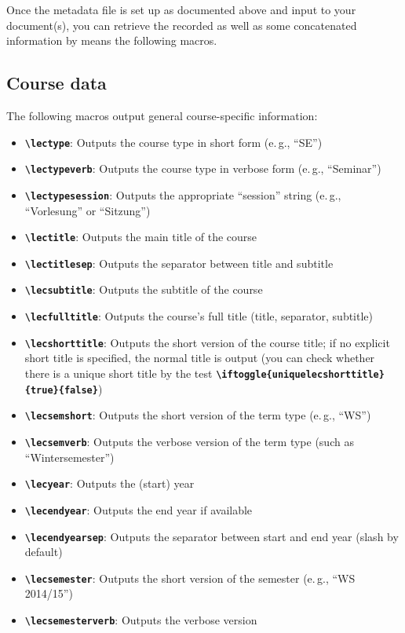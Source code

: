 \documentclass[english]{article}
\newcommand*\jmacro[1]{\textbf{\texttt{#1}}}
\newcommand*\jcsmacro[1]{\jmacro{\textbackslash{#1}}}
\newcommand*\jparam[1]{\angus #1\angud}
\begin{document}
Once the metadata file is set up as documented above and input to
your document(s), you can retrieve the recorded as well as some concatenated
information by means the following macros.


\subsection{Course data}\label{sec:csdata}

The following macros output general course-specific information:
\begin{itemize}
\item \jcsmacro{lectype}: Outputs the course type in short
form (e.\,g., ``SE'')
\item \jcsmacro{lectypeverb}: Outputs the course type in
verbose form (e.\,g., ``Seminar'')
\item \jcsmacro{lectypesession}: Outputs the appropriate
``session'' string (e.\,g., ``Vorlesung'' or ``Sitzung'')
\item \jcsmacro{lectitle}: Outputs the main title of the
course
\item \jcsmacro{lectitlesep}: Outputs the separator between
title and subtitle
\item \jcsmacro{lecsubtitle}: Outputs the subtitle of the course
\item \jcsmacro{lecfulltitle}: Outputs the course's full title
    (title, separator, subtitle)
\item \jcsmacro{lecshorttitle}: Outputs the short version
of the course title; if no explicit short title is specified,
the normal title is output (you can check whether
there is a unique short title by the test
\jcsmacro{iftoggle\{uniquelecshorttitle\}\{\jparam{true}\}\{\jparam{false}\}})
\item \jcsmacro{lecsemshort}: Outputs the short version of
the term type (e.\,g., ``WS'')
\item \jcsmacro{lecsemverb}: Outputs the verbose version
of the term type (such as ``Winter\-semester'')
\item \jcsmacro{lecyear}: Outputs the (start) year
\item \jcsmacro{lecendyear}: Outputs the end year if available
\item \jcsmacro{lecendyearsep}: Outputs the separator between start and end year (slash by default)
\item \jcsmacro{lecsemester}: Outputs the short version of
the semester (e.\,g., ``WS 2014/15'')
\item \jcsmacro{lecsemesterverb}: Outputs the verbose version

\end{itemize}
\end{document}
